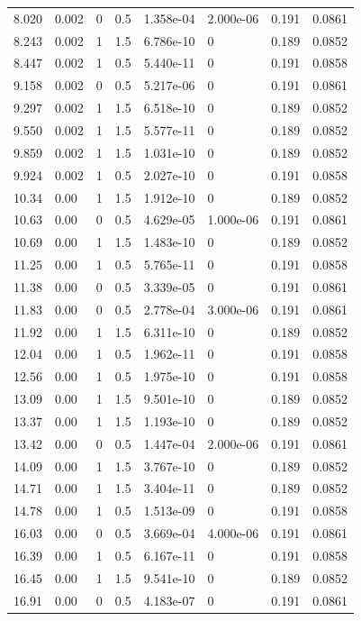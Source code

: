 \documentclass[preview]{standalone}
\begin{document}
{{\begin{tabular}{L{1.2cm}C{1.2cm} C{0.3cm}C{0.5cm} C{1.4cm}C{1.4cm} C{1.4cm}C{1.4cm}}
  8.020  &  0.002  & 0     & 0.5 &  1.358e-04  & 2.000e-06  & 0.191 &  0.0861   \\ 
  8.243  &  0.002  & 1     & 1.5 &  6.786e-10  & 0  & 0.189 &  0.0852   \\ 
  8.447  &  0.002  & 1     & 0.5 &  5.440e-11  & 0  & 0.191 &  0.0858   \\ 
  9.158  &  0.002  & 0     & 0.5 &  5.217e-06  & 0  & 0.191 &  0.0861   \\ 
  9.297  &  0.002  & 1     & 1.5 &  6.518e-10  & 0  & 0.189 &  0.0852   \\ 
  9.550  &  0.002  & 1     & 1.5 &  5.577e-11  & 0  & 0.189 &  0.0852   \\ 
  9.859  &  0.002  & 1     & 1.5 &  1.031e-10  & 0  & 0.189 &  0.0852   \\ 
  9.924  &  0.002  & 1     & 0.5 &  2.027e-10  & 0  & 0.191 &  0.0858   \\ 
  10.34  &  0.00  & 1     & 1.5 &  1.912e-10  & 0  & 0.189 &  0.0852   \\ 
  10.63  &  0.00  & 0     & 0.5 &  4.629e-05  & 1.000e-06  & 0.191 &  0.0861   \\ 
  10.69  &  0.00  & 1     & 1.5 &  1.483e-10  & 0  & 0.189 &  0.0852   \\ 
  11.25  &  0.00  & 1     & 0.5 &  5.765e-11  & 0  & 0.191 &  0.0858   \\ 
  11.38  &  0.00  & 0     & 0.5 &  3.339e-05  & 0  & 0.191 &  0.0861   \\ 
  11.83  &  0.00  & 0     & 0.5 &  2.778e-04  & 3.000e-06  & 0.191 &  0.0861   \\ 
  11.92  &  0.00  & 1     & 1.5 &  6.311e-10  & 0  & 0.189 &  0.0852   \\ 
  12.04  &  0.00  & 1     & 0.5 &  1.962e-11  & 0  & 0.191 &  0.0858   \\ 
  12.56  &  0.00  & 1     & 0.5 &  1.975e-10  & 0  & 0.191 &  0.0858   \\ 
  13.09  &  0.00  & 1     & 1.5 &  9.501e-10  & 0  & 0.189 &  0.0852   \\ 
  13.37  &  0.00  & 1     & 1.5 &  1.193e-10  & 0  & 0.189 &  0.0852   \\ 
  13.42  &  0.00  & 0     & 0.5 &  1.447e-04  & 2.000e-06  & 0.191 &  0.0861   \\ 
  14.09  &  0.00  & 1     & 1.5 &  3.767e-10  & 0  & 0.189 &  0.0852   \\ 
  14.71  &  0.00  & 1     & 1.5 &  3.404e-11  & 0  & 0.189 &  0.0852   \\ 
  14.78  &  0.00  & 1     & 0.5 &  1.513e-09  & 0  & 0.191 &  0.0858   \\ 
  16.03  &  0.00  & 0     & 0.5 &  3.669e-04  & 4.000e-06  & 0.191 &  0.0861   \\ 
  16.39  &  0.00  & 1     & 0.5 &  6.167e-11  & 0  & 0.191 &  0.0858   \\ 
  16.45  &  0.00  & 1     & 1.5 &  9.541e-10  & 0  & 0.189 &  0.0852   \\ 
  16.91  &  0.00  & 0     & 0.5 &  4.183e-07  & 0  & 0.191 &  0.0861   \\ 
\hline 
\end{tabular} 

}}
\end{document}
